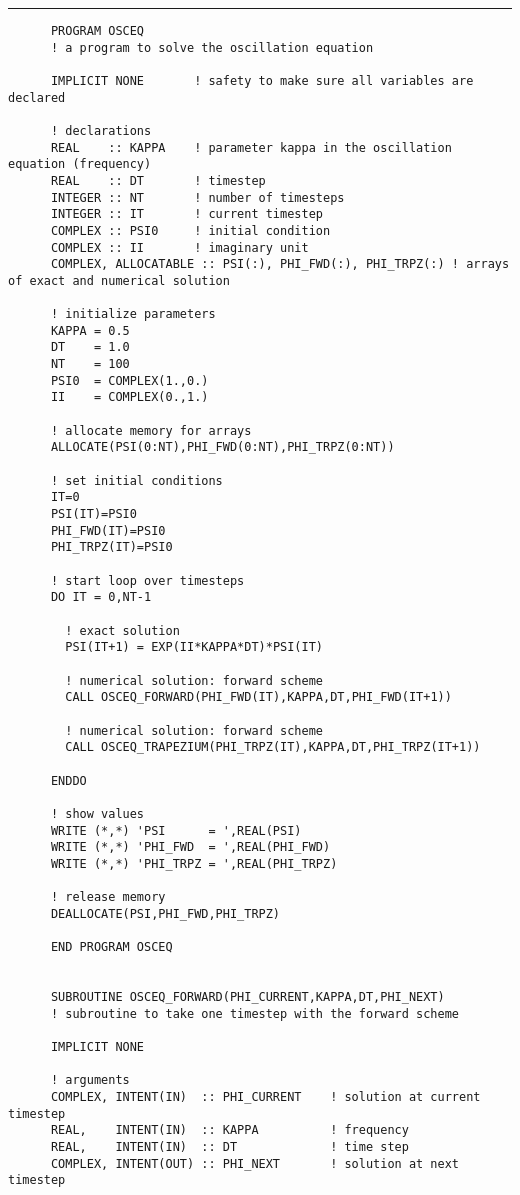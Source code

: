 \documentclass[a4paper]{article}
\begin{document}
{\vspace{10pt}\hrule\small\vspace*{-2pt}\begin{verbatim}
	  PROGRAM OSCEQ
	  ! a program to solve the oscillation equation

	  IMPLICIT NONE       ! safety to make sure all variables are declared

	  ! declarations
	  REAL    :: KAPPA    ! parameter kappa in the oscillation equation (frequency)
	  REAL    :: DT       ! timestep
	  INTEGER :: NT       ! number of timesteps
	  INTEGER :: IT       ! current timestep
	  COMPLEX :: PSI0     ! initial condition
	  COMPLEX :: II       ! imaginary unit
	  COMPLEX, ALLOCATABLE :: PSI(:), PHI_FWD(:), PHI_TRPZ(:) ! arrays of exact and numerical solution

	  ! initialize parameters
	  KAPPA = 0.5
	  DT    = 1.0
	  NT    = 100
	  PSI0  = COMPLEX(1.,0.)
	  II    = COMPLEX(0.,1.)

	  ! allocate memory for arrays
	  ALLOCATE(PSI(0:NT),PHI_FWD(0:NT),PHI_TRPZ(0:NT))

	  ! set initial conditions
	  IT=0
	  PSI(IT)=PSI0
	  PHI_FWD(IT)=PSI0
	  PHI_TRPZ(IT)=PSI0

	  ! start loop over timesteps
	  DO IT = 0,NT-1
	  	
	  	! exact solution
	  	PSI(IT+1) = EXP(II*KAPPA*DT)*PSI(IT)
	  	
	  	! numerical solution: forward scheme
	  	CALL OSCEQ_FORWARD(PHI_FWD(IT),KAPPA,DT,PHI_FWD(IT+1))
	  	
	  	! numerical solution: forward scheme
	  	CALL OSCEQ_TRAPEZIUM(PHI_TRPZ(IT),KAPPA,DT,PHI_TRPZ(IT+1))

	  ENDDO

	  ! show values
	  WRITE (*,*) 'PSI      = ',REAL(PSI)
	  WRITE (*,*) 'PHI_FWD  = ',REAL(PHI_FWD)
	  WRITE (*,*) 'PHI_TRPZ = ',REAL(PHI_TRPZ)

	  ! release memory
	  DEALLOCATE(PSI,PHI_FWD,PHI_TRPZ)

	  END PROGRAM OSCEQ

	  
	  SUBROUTINE OSCEQ_FORWARD(PHI_CURRENT,KAPPA,DT,PHI_NEXT)
	  ! subroutine to take one timestep with the forward scheme
	  
	  IMPLICIT NONE
	  
	  ! arguments
	  COMPLEX, INTENT(IN)  :: PHI_CURRENT    ! solution at current timestep
	  REAL,    INTENT(IN)  :: KAPPA          ! frequency
	  REAL,    INTENT(IN)  :: DT             ! time step
	  COMPLEX, INTENT(OUT) :: PHI_NEXT       ! solution at next timestep
	  

\end{verbatim}}
\end{document}
